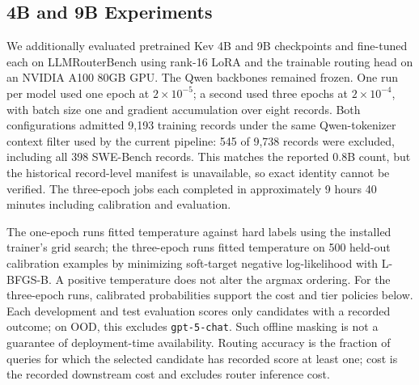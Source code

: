 \documentclass[11pt,a4paper]{article}
\begin{document}
\subsection{4B and 9B Experiments}
\label{subsec:larger_models}

We additionally evaluated pretrained Kev 4B and 9B checkpoints and fine-tuned each on LLMRouterBench using rank-16 LoRA and the trainable routing head on an NVIDIA A100 80GB GPU. The Qwen backbones remained frozen. One run per model used one epoch at $2\times10^{-5}$; a second used three epochs at $2\times10^{-4}$, with batch size one and gradient accumulation over eight records. Both configurations admitted 9,193 training records under the same Qwen-tokenizer context filter used by the current pipeline: 545 of 9,738 records were excluded, including all 398 SWE-Bench records. This matches the reported 0.8B count, but the historical record-level manifest is unavailable, so exact identity cannot be verified. The three-epoch jobs each completed in approximately 9 hours 40 minutes including calibration and evaluation.

The one-epoch runs fitted temperature against hard labels using the installed trainer's grid search; the three-epoch runs fitted temperature on 500 held-out calibration examples by minimizing soft-target negative log-likelihood with L-BFGS-B. A positive temperature does not alter the argmax ordering. For the three-epoch runs, calibrated probabilities support the cost and tier policies below. Each development and test evaluation scores only candidates with a recorded outcome; on OOD, this excludes \texttt{gpt-5-chat}. Such offline masking is not a guarantee of deployment-time availability. Routing accuracy is the fraction of queries for which the selected candidate has recorded score at least one; cost is the recorded downstream cost and excludes router inference cost.
\end{document}
